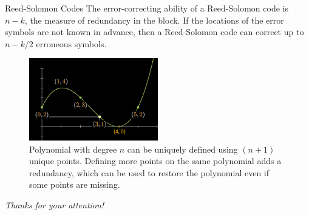 \documentclass{beamer}
\begin{document}
    \begin{frame}{Reed-Solomon Codes}
        The error-correcting ability of a Reed-Solomon code is $n-k$, the measure of redundancy in the block. 
        If the locations of the error symbols are not known in advance, then a Reed-Solomon code can correct up to
        $n-k/2$ erroneous symbols.
  
        \begin{figure}
          \centering
          \includegraphics[width=0.5\textwidth]{images/lecture_2/reed-solomon-2.png}
          \caption{Polynomial with degree $n$ can be uniquely defined using $(n+1)$ unique points. Defining more points on the same polynomial adds a redundancy, which can be used to restore the polynomial even if some points are missing.}
          \label{fig:shamir}
        \end{figure}
    \end{frame}
  
    \begin{frame}{}
        \centering \Large
        \emph{Thanks for your attention!}
      \end{frame}
\end{document}
